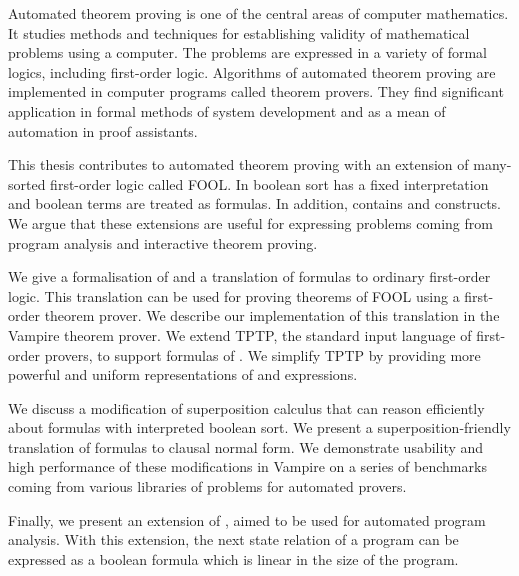 Automated theorem proving is one of the central areas of computer mathematics. It studies methods and techniques for establishing validity of mathematical problems using a computer. The problems are expressed in a variety of formal logics, including first-order logic. Algorithms of automated theorem proving are implemented in computer programs called theorem provers. They find significant application in formal methods of system development and as a mean of automation in proof assistants.

This thesis contributes to automated theorem proving with an extension of many-sorted first-order logic called FOOL. In \folb{} boolean sort has a fixed interpretation and boolean terms are treated as formulas. In addition, \folb{} contains \ITE{} and \LETIN{} constructs. We argue that these extensions are useful for expressing problems coming from program analysis and interactive theorem proving. 

We give a formalisation of \folb{} and a translation of \folb{} formulas to ordinary first-order logic. This translation can be used for proving theorems of FOOL using a first-order theorem prover. We describe our implementation of this translation in the Vampire theorem prover. We extend TPTP, the standard input language of first-order provers, to support formulas of \folb{}. We simplify TPTP by providing more powerful and uniform representations of \ITE{} and \LETIN{} expressions.

We discuss a modification of superposition calculus that can reason efficiently about formulas with interpreted boolean sort. We present a superposition-friendly translation of \folb{} formulas to clausal normal form. We demonstrate usability and high performance of these modifications in Vampire on a series of benchmarks coming from various libraries of problems for automated provers.

Finally, we present an extension of \folb, aimed to be used for automated program analysis. With this extension, the next state relation of a program can be expressed as a boolean formula which is linear in the size of the program.